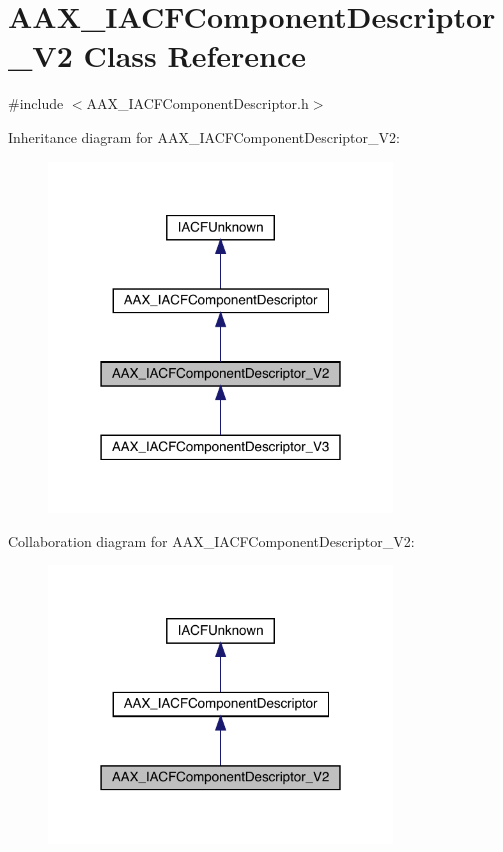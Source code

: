\hypertarget{a01629}{}\section{A\+A\+X\+\_\+\+I\+A\+C\+F\+Component\+Descriptor\+\_\+\+V2 Class Reference}
\label{a01629}


{\ttfamily \#include $<$A\+A\+X\+\_\+\+I\+A\+C\+F\+Component\+Descriptor.\+h$>$}



Inheritance diagram for A\+A\+X\+\_\+\+I\+A\+C\+F\+Component\+Descriptor\+\_\+\+V2\+:
\nopagebreak
\begin{figure}[H]
\begin{center}
\leavevmode
\includegraphics[width=259pt]{a01628}
\end{center}
\end{figure}


Collaboration diagram for A\+A\+X\+\_\+\+I\+A\+C\+F\+Component\+Descriptor\+\_\+\+V2\+:
\nopagebreak
\begin{figure}[H]
\begin{center}
\leavevmode
\includegraphics[width=259pt]{a01627}
\end{center}
\end{figure}


